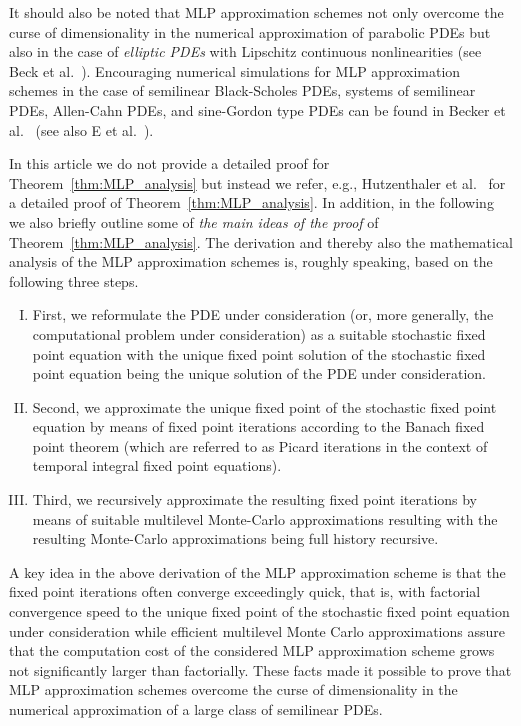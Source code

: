 \documentclass[12pt]{article}
\theoremstyle{definition}
\begin{document}
It should also be noted that MLP approximation 
schemes not only overcome the curse of dimensionality 
in the numerical approximation of parabolic PDEs but also in the case of \emph{elliptic PDEs} with Lipschitz 
continuous nonlinearities (see Beck et al.~\cite{beck2020arxiv2003}). 
Encouraging numerical simulations for MLP approximation schemes 
in the case of semilinear Black-Scholes PDEs, systems of semilinear PDEs, Allen-Cahn PDEs, 
and sine-Gordon type PDEs can be found in Becker et al.~\cite{becker2020arxiv2005} (see also E et al.~\cite{E2019multilevel}).


In this article we do not provide a detailed proof for Theorem~\ref{thm:MLP_analysis} 
but instead we refer, e.g., Hutzenthaler et al.~\cite{Hutzenthaleretal2018arXiv,hutzenthaler2020lipschitz}
for a detailed proof of Theorem~\ref{thm:MLP_analysis}. 
In addition, in the following we also briefly outline 
some of \emph{the main ideas of the proof} of Theorem~\ref{thm:MLP_analysis}. 
The derivation and thereby also the mathematical analysis of the MLP approximation schemes 
%
is, roughly speaking, based on the following three steps. 
\begin{enumerate}[(I)]
\item 
First, we reformulate the PDE under consideration (or, more generally, the computational problem under consideration) 
as a suitable stochastic fixed point equation with the unique fixed point solution of 
the stochastic fixed point equation being the unique solution of the PDE under consideration. 
\item 
Second, we approximate the unique fixed point of the stochastic fixed point equation by means 
of fixed point iterations according to the Banach fixed point theorem (which are referred to as 
Picard iterations in the context of temporal integral fixed point equations). 
\item 
Third, we recursively approximate the resulting fixed point iterations by means of 
suitable multilevel Monte-Carlo approximations resulting with the resulting Monte-Carlo approximations 
being full history recursive. 
\end{enumerate}
A key idea in the above derivation of the MLP approximation scheme is that the fixed point iterations often converge 
exceedingly quick, that is, with factorial convergence speed to the unique fixed point of the stochastic fixed 
point equation under consideration while efficient multilevel Monte Carlo approximations assure that the 
computation cost of the considered MLP approximation scheme grows 
not significantly larger than factorially. 
These facts made it possible to prove that MLP approximation schemes overcome the curse of dimensionality 
in the numerical approximation of a large class of semilinear PDEs. 
\end{document}
